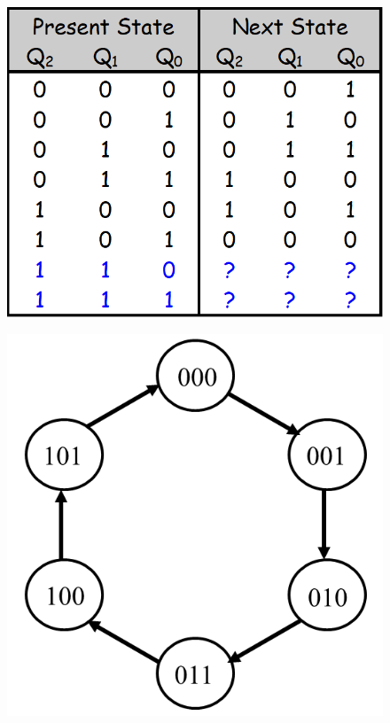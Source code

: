 \begin{figure}[H]
  \centering
  \begin{minipage}{0.49\linewidth}
      \centering
      \includegraphics[width=\linewidth]{img/unused-state-table.png}
      \label{fig:unused-state-table}
  \end{minipage}\hfill
  \begin{minipage}{0.49\linewidth}
      \centering
      \includegraphics[width=\linewidth]{img/unused-state-diagram.png}
      \label{fig:unused-state-diagram.png}
  \end{minipage}
\end{figure}


